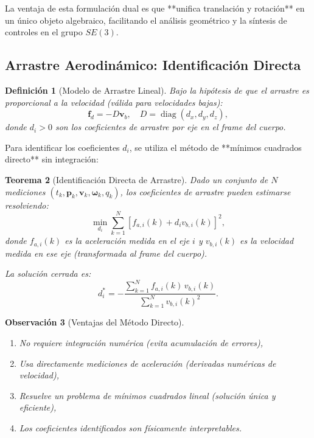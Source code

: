\documentclass[11pt,a4paper]{article}
\newtheorem{theorem}{Teorema}[section]
\newtheorem{definition}[theorem]{Definición}
\newtheorem{remark}[theorem]{Observación}
\begin{document}
La ventaja de esta formulación dual es que **unifica translación y rotación** en un único objeto algebraico, facilitando el análisis geométrico y la síntesis de controles en el grupo $SE(3)$.

\subsection{Arrastre Aerodinámico: Identificación Directa}

\begin{definition}[Modelo de Arrastre Lineal]
Bajo la hipótesis de que el arrastre es proporcional a la velocidad (válida para velocidades bajas):
\begin{equation}
    \mathbf{f}_d = -D \mathbf{v}_b, \quad D = \operatorname{diag}(d_x, d_y, d_z),
\end{equation}
donde $d_i > 0$ son los coeficientes de arrastre por eje en el frame del cuerpo.
\end{definition}

Para identificar los coeficientes $d_i$, se utiliza el método de **mínimos cuadrados directo** sin integración:

\begin{theorem}[Identificación Directa de Arrastre]
Dado un conjunto de $N$ mediciones $(t_k, \mathbf{p}_k, \mathbf{v}_k, \boldsymbol{\omega}_k, q_k)$, los coeficientes de arrastre pueden estimarse resolviendo:
\begin{equation}
    \min_{d_i} \sum_{k=1}^{N} \left[ f_{a,i}(k) + d_i v_{b,i}(k) \right]^2,
\end{equation}
donde $f_{a,i}(k)$ es la aceleración medida en el eje $i$ y $v_{b,i}(k)$ es la velocidad medida en ese eje (transformada al frame del cuerpo).

La solución cerrada es:
\begin{equation}
    d_i^* = -\frac{\sum_{k=1}^{N} f_{a,i}(k) \, v_{b,i}(k)}{\sum_{k=1}^{N} v_{b,i}(k)^2}.
\end{equation}
\end{theorem}

\begin{remark}[Ventajas del Método Directo]
\begin{enumerate}
    \item No requiere integración numérica (evita acumulación de errores),
    \item Usa directamente mediciones de aceleración (derivadas numéricas de velocidad),
    \item Resuelve un problema de mínimos cuadrados lineal (solución única y eficiente),
    \item Los coeficientes identificados son físicamente interpretables.
\end{enumerate}
\end{remark}
\end{document}

